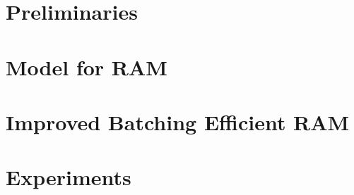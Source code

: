 \documentclass[sigconf]{acmart}
\begin{document}
\section{Preliminaries}\label{sec:prelims}
    

\section{Model for RAM}\label{sec:model-for-ram}


\section{Improved Batching Efficient RAM}\label{sec:batch-efficient-ram}


\section{Experiments}\label{sec:experiments}




\appendix

\end{document}
